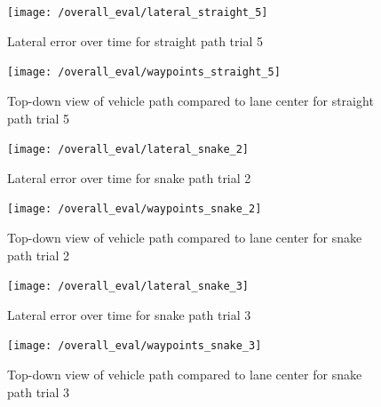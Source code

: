 \documentclass[titlepage, draft]{article}
\begin{document}
{\begin{figure}[H]
	\centering
	\begin{minipage}{.45\textwidth}
		\centering
		\texttt{[image: /overall\_eval/lateral\_straight\_5]}
		\caption{Lateral error over time for straight path trial 5}
		\label{fig:straight_lat_5}
	\end{minipage}%
	\hspace{0.1\textwidth}%
	\begin{minipage}{.45\textwidth}
		\centering
		\texttt{[image: /overall\_eval/waypoints\_straight\_5]}
		\caption{Top-down view of vehicle path compared to lane center for straight path trial 5}
		\label{fig:straight_way_5}
	\end{minipage}
\end{figure}









\begin{figure}[H]
	\centering
	\begin{minipage}{.45\textwidth}
		\centering
		\texttt{[image: /overall\_eval/lateral\_snake\_2]}
		\caption{Lateral error over time for snake path trial 2}
		\label{fig:snake_lat_2}
	\end{minipage}%
	\hspace{0.1\textwidth}%
	\begin{minipage}{.45\textwidth}
		\centering
		\texttt{[image: /overall\_eval/waypoints\_snake\_2]}
		\caption{Top-down view of vehicle path compared to lane center for snake path trial 2}
		\label{fig:snake_way_2}
	\end{minipage}
\end{figure}

\begin{figure}[H]
	\centering
	\begin{minipage}{.45\textwidth}
		\centering
		\texttt{[image: /overall\_eval/lateral\_snake\_3]}
		\caption{Lateral error over time for snake path trial 3}
		\label{fig:snake_lat_3}
	\end{minipage}%
	\hspace{0.1\textwidth}%
	\begin{minipage}{.45\textwidth}
		\centering
		\texttt{[image: /overall\_eval/waypoints\_snake\_3]}
		\caption{Top-down view of vehicle path compared to lane center for snake path trial 3}
		\label{fig:snake_way_3}
	\end{minipage}
\end{figure}

}
\end{document}
